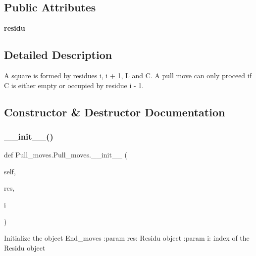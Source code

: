 \subsection*{Public Attributes}
\begin{DoxyCompactItemize}
\item 
\mbox{\label{classPull__moves_1_1Pull__moves_aa85e15fa4b93a732a2015e3e5f9e8002}} 
{\bfseries residu}
\end{DoxyCompactItemize}


\subsection{Detailed Description}
\begin{DoxyVerb}A square is formed by residues i, i + 1, L and C.
    A pull move can only proceed if C is either empty or occupied by residue i - 1.
\end{DoxyVerb}
 

\subsection{Constructor \& Destructor Documentation}
\mbox{\label{classPull__moves_1_1Pull__moves_a6456567c18974da96c3c8bbbca78b989}} 
\subsubsection{\texorpdfstring{\+\_\+\+\_\+init\+\_\+\+\_\+()}{\_\_init\_\_()}}
{\footnotesize\ttfamily def Pull\+\_\+moves.\+Pull\+\_\+moves.\+\_\+\+\_\+init\+\_\+\+\_\+ (\begin{DoxyParamCaption}\item[{}]{self,  }\item[{}]{res,  }\item[{}]{i }\end{DoxyParamCaption})}

\begin{DoxyVerb}Initialize the object End_moves
    :param res: Residu object
    :param   i: index of the Residu object
\end{DoxyVerb}
 

